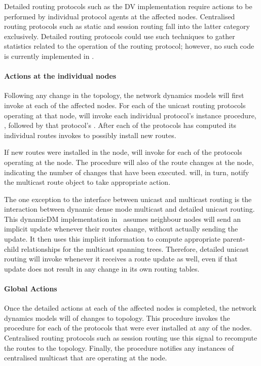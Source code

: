 Detailed routing protocols such as the DV implementation
require actions to be performed by individual protocol agents at the
affected nodes.
Centralised routing protocols such as static and session routing fall into
the latter category exclusively.
Detailed routing protocols could use such techniques to gather statistics
related to the operation of the routing protocol;
however, no such code is currently implemented in \ns.

\paragraph{Actions at the individual nodes}
Following any change in the topology,
the network dynamics models will first invoke
at each of the affected nodes.
For each of the unicast routing protocols operating at that node,
 will invoke 
each individual protocol's instance procedure,  ,
followed by that protocol's .
After each of the protocols has computed its individual routes
 invokes 
to possibly install new routes.

If new routes were installed in the node,
 will invoke
 for each of the protocols operating at the node.
The procedure will also
of the route changes at the node, indicating the number of changes 
that have been executed.
 will, in turn, notify
the multicast route object to take appropriate action.

The one exception
to the interface between unicast and multicast routing is the interaction
between dynamic dense mode multicast and detailed unicast routing.
This dynamicDM implementation in \ns\ assumes neighbour nodes
will send an implicit update whenever their routes change,
without actually sending the update.  
It then uses this implicit information to compute
appropriate parent-child relationships for the multicast spanning trees.
Therefore, detailed unicast routing will invoke
 whenever it receives a route update as well,
even if that update does not result in any change in its own routing tables.

\paragraph{Global Actions}
Once the detailed actions at each of the affected nodes is completed,
the network dynamics models will
of changes to topology.
This procedure invokes the procedure 
for each of the protocols that were ever installed at any of the nodes.
Centralised routing protocols such as session routing use this signal to
recompute the routes to the topology.
Finally, the  procedure notifies 
any instances of centralised multicast that are operating at the node.

